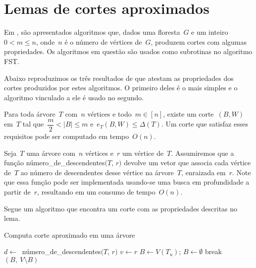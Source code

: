 \section {Lemas de cortes aproximados}

Em \cite{Schmidt15}, são apresentados 
algoritmos que, dados uma floresta~$G$ e um 
inteiro~${0<m\le n}$, onde~$n$ é o número de vértices de~$G$, 
produzem cortes com algumas propriedades.
Os algoritmos em questão são usados como subrotinas no algoritmo
FST.

Abaixo reproduzimos os três resultados de \cite{Schmidt15} que 
atestam as propriedades dos cortes produzidos por estes algoritmos.
O primeiro deles é o mais simples e o algoritmo vinculado a ele
é usado no segundo.

\bigskip

\begin{lem}[]
\label{lema:simpleApproxCutTree}
	Para toda árvore~$T$ com~$n$ vértices e todo~${m \in [n]}$,
	existe um corte~$(B,W)$ em~$T$ tal 
	que~${\dfrac{m}{2} <|B| \le m}$ e~${e_T(B,W) \le \Delta(T)}$.
	Um corte que satisfaz esses requisitos pode ser computado em
	tempo~$O(n)$.
\end{lem}

\bigskip

Seja~$T$ uma árvore com~$n$ vértices e~$r$ um vértice de~$T$. 
Assumiremos que
a função {\sc número\_de\_descendentes}$(T$, $r)$ devolve um vetor
que associa cada vértice de~$T$ ao número de descendentes desse 
vértice na árvore~$T$, enraizada em~$r$. 
Note que essa função 
pode ser implementada usando-se uma busca em profundidade
a partir de~$r$,
resultando em um consumo de tempo~$O(n)$.


Segue um algoritmo que encontra um corte com as propriedades 
descritas no lema.

\bigskip

\begin{algorithm}[H]
\label{alg:simpleApproxCutTree}

	\caption{Computa corte aproximado em uma árvore}
		$d \gets~$ {\sc número\_de\_descendentes}$(T$, $r)$\;
		$v \gets r$\;
		{
			$B\gets V(T_u)$; \quad
		}
		{
		$B \gets \emptyset$\;
		{
			{
				break\;
			}
		}
		}
	\Return $(B,\ V\setminus B)$

\end{algorithm}	


